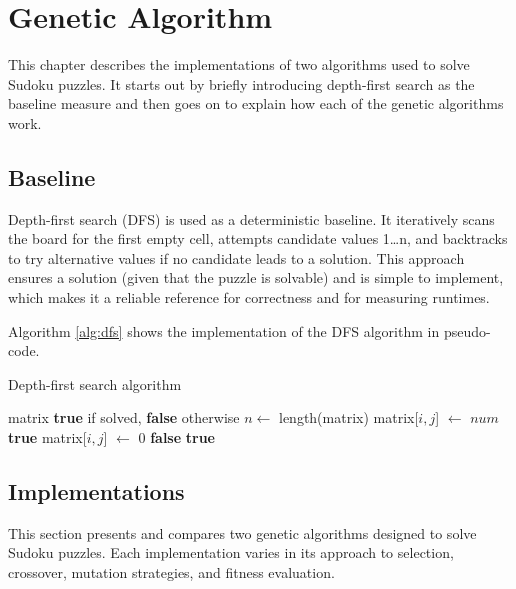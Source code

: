 \section{Genetic Algorithm}\label{sec:algorithm}
This chapter describes the implementations of two algorithms used to solve Sudoku puzzles.
It starts out by briefly introducing depth-first search as the baseline measure and then goes on to explain how each of the genetic algorithms work.

\subsection{Baseline}
Depth-first search (DFS) is used as a deterministic baseline. It iteratively scans the board for the first empty cell, attempts candidate values 1\dots n, and backtracks to try alternative values if no candidate leads to a solution. This approach ensures a solution (given that the puzzle is solvable) and is simple to implement, which makes it a reliable reference for correctness and for measuring runtimes.

Algorithm \ref{alg:dfs} shows the implementation of the DFS algorithm in pseudo-code.

\begin{algorithm}[H]
\caption{Depth-first search algorithm}\label{alg:dfs}
\begin{adjustbox}{width=1\textwidth,left}
\begin{minipage}{\textwidth}
\begin{algorithmic}
\Require matrix
\Ensure \textbf{true} if solved, \textbf{false} otherwise
\State $n \gets$ length(matrix)
          \State matrix[$i,j$] $\gets$ $num$
           \State \Return \textbf{true} \EndIf
          \State matrix[$i,j$] $\gets$ 0
        \EndIf
      \EndFor
      \State \Return \textbf{false}
    \EndIf
  \EndFor
\EndFor
\State \Return \textbf{true}
\end{algorithmic}
\end{minipage}
\end{adjustbox}
\end{algorithm}

\subsection{Implementations}
This section presents and compares two genetic algorithms designed to solve Sudoku puzzles. Each implementation varies in its approach to selection, crossover, mutation strategies, and fitness evaluation.

